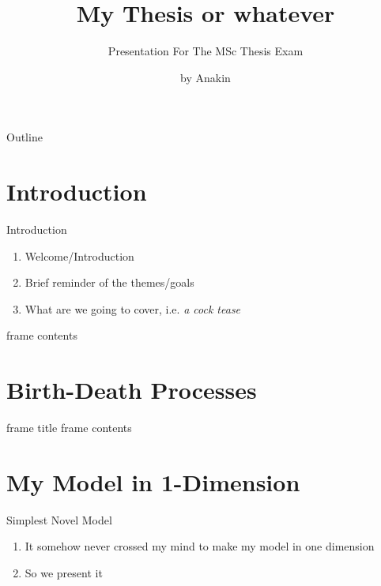 \documentclass[aspectratio=169,  notheorems, sOuRcEs]{RUCPresentation}
\title{%
    My Thesis or whatever
}
\subtitle{Presentation For The MSc Thesis Exam}
\author{by Anakin}
\newcounter{reaction}
\newcommand\makebeamertitle{\frame{\maketitle}}%
\begin{document}
\makebeamertitle


\begin{frame}{Outline}

    \tableofcontents

\end{frame}



\section{Introduction}
\begin{frame}{Introduction}

    \begin{enumerate}
        \item Welcome/Introduction
        \item Brief reminder of the themes/goals
        \item What are we going to cover, i.e. \emph{a cock tease}
    \end{enumerate}

\end{frame}

\begin{frame}{}
    frame contents
\end{frame}

\section{Birth-Death Processes}
\begin{frame}{frame title}
    frame contents
\end{frame}


\section{My Model in 1-Dimension}
\begin{frame}{Simplest Novel Model}

    \begin{enumerate}
        \item It somehow never crossed my mind to make my model in one dimension
        \item So we present it
    \end{enumerate}

    \begin{reactiontable}
    \end{reactiontable}


\end{frame}
\end{document}
